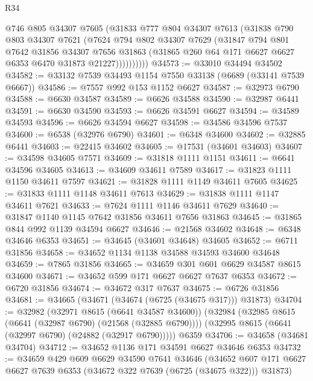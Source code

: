 \begin{lexlean}{R34}
\begin{coremodule}
              @746
              @805
              @34307
              @7605
              (@31833
                @777
                @804
                @34307
                @7613
                (@31838
                  @790
                  @803
                  @34307
                  @7621
                  (@7624
                    @794
                    @802
                    @34307
                    @7629
                    (@31847
                      @794
                      @801
                      @7642
                      @31856
                      @34307
                      @7656
                      @31863
                      (@31865 @260 @64 @171 @6627 @6627 @6353 @6470 @31873 @21227))))))))))
@34573 := @33010 @34494 @34502
@34582 := @33132 @7539 @34493 @1154 @7550 @33138 (@6689 (@33141 @7539 @6667))
@34586 := @7557 @992 @153 @1152 @6627
@34587 := @32973 @6790
@34588 := @6630 @34587
@34589 := @6626 @34588
@34590 := @32987 @6441
@34591 := @6630 @34590
@34593 := @6626 @34591 @6627
@34594 := @34589 @34593
@34596 := @6626 @34594 @6627
@34598 := @34586 @34596 @7537
@34600 := @6538 (@32976 @6790)
@34601 := @6348 @34600
@34602 := @32885 @6441
@34603 := @22415 @34602
@34605 := @17531 (@34601 @34603)
@34607 := @34598 @34605 @7571
@34609 := @31818 @1111 @1151
@34611 := @6641 @34596 @34605
@34613 := @34609 @34611 @7589
@34617 := @31823 @1111 @1150 @34611 @7597
@34621 := @31828 @1111 @1149 @34611 @7605
@34625 := @31833 @1111 @1148 @34611 @7613
@34629 := @31838 @1111 @1147 @34611 @7621
@34633 := @7624 @1111 @1146 @34611 @7629
@34640 := @31847 @1140 @1145 @7642 @31856 @34611 @7656 @31863
@34645 := @31865 @844 @992 @1139 @34594 @6627
@34646 := @21568 @34602
@34648 := @6348 @34646 @6353
@34651 := @34645 (@34601 @34648) @34605
@34652 := @6711 @31856
@34658 := @34652 @1134 @1138 @34588 @34593 @34600 @34648
@34659 := @7865 @31856
@34665 := @34659 @301 @601 @6629 @34587 @8615 @34600
@34671 := @34652 @599 @171 @6627 @6627 @7637 @6353
@34672 := @6720 @31856
@34674 := @34672 @317 @7637
@34675 := @6726 @31856
@34681 := @34665 (@34671 (@34674 (@6725 (@34675 @317))) @31873)
@34704 := @32982
    (@32971 @8615 (@6641 @34587 @34600))
    (@32984
      (@32985 @8615 (@6641 (@32987 @6790) (@21568 (@32885 @6790))))
      (@32995 @8615 (@6641 (@32997 @6790) (@24882 (@32917 @6790)))))
    @6359
@34706 := @34658 (@34681 @34704)
@34712 := @34652 @1136 @171 @34591 @6627 @34646 @6353
@34732 := @34659
    @429
    @609
    @6629
    @34590
    @7641
    @34646
    (@34652 @607 @171 @6627 @6627 @7639 @6353 (@34672 @322 @7639 (@6725 (@34675 @322))) @31873)

\end{coremodule}
\end{lexlean}

